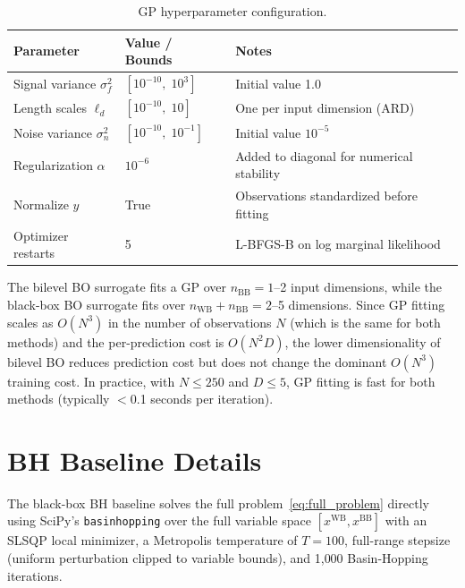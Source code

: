 \documentclass[12pt,a4paper]{article}%
\theoremstyle{plain}%
\theoremstyle{remark}%
\theoremstyle{definition}%
\def\WB{\mathrm{WB}}
\def\BB{\mathrm{BB}}
\begin{document}
\begin{appendices}
\begin{table}[htbp]
\centering
\caption{GP hyperparameter configuration.}
\label{tab:gp_hyperparams}
\begin{tabular}{@{}lll@{}}
\toprule
\textbf{Parameter} & \textbf{Value / Bounds} & \textbf{Notes} \\
\midrule
Signal variance $\sigma_f^2$ & $[10^{-10},\; 10^3]$ & Initial value 1.0 \\
Length scales $\ell_d$ & $[10^{-10},\; 10]$ & One per input dimension (ARD) \\
Noise variance $\sigma_n^2$ & $[10^{-10},\; 10^{-1}]$ & Initial value $10^{-5}$ \\
Regularization $\alpha$ & $10^{-6}$ & Added to diagonal for numerical stability \\
Normalize $y$ & True & Observations standardized before fitting \\
Optimizer restarts & 5 & L-BFGS-B on log marginal likelihood \\
\bottomrule
\end{tabular}
\end{table}

The bilevel BO surrogate fits a GP over $n_{\BB} = 1$--2 input dimensions, while the black-box BO surrogate fits over $n_{\WB}+n_{\BB} = 2$--5 dimensions. Since GP fitting scales as $O(N^3)$ in the number of observations $N$ (which is the same for both methods) and the per-prediction cost is $O(N^2 D)$, the lower dimensionality of bilevel BO reduces prediction cost but does not change the dominant $O(N^3)$ training cost. In practice, with $N \leq 250$ and $D \leq 5$, GP fitting is fast for both methods (typically $<$0.1 seconds per iteration).

\section{BH Baseline Details}\label{sec:nlp_details}

The black-box BH baseline solves the full problem~\eqref{eq:full_problem} directly using SciPy's \texttt{basinhopping} over the full variable space $[x^{\WB}, x^{\BB}]$ with an SLSQP local minimizer, a Metropolis temperature of $T=100$, full-range stepsize (uniform perturbation clipped to variable bounds), and 1{,}000 Basin-Hopping iterations.


\end{appendices}
\end{document}
